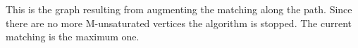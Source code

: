 \documentclass[11pt,a4paper]{article}
\begin{document}
This is the graph resulting from augmenting the matching along the path. Since there are no more M-unsaturated vertices the algorithm is stopped. The current matching is the maximum one.



\end{document}
